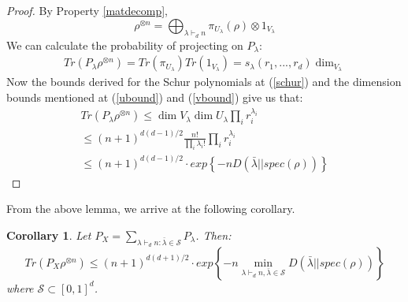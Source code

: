 \documentclass[12pt]{article}%
\newtheorem{coro}{Corollary}
\begin{document}
\begin{proof}
 By Property \ref{matdecomp},
 $$ \rho^{\otimes n} = \bigoplus_{\lambda \vdash_d n} \pi_{U_\lambda}(\rho) \otimes 1_{V_\lambda}$$
 We can calculate the probability of projecting on $P_{\lambda}$:
 \begin{gather*}
   Tr(P_\lambda\rho^{\otimes n}) = Tr(\pi_{U_\lambda})Tr(1_{V_\lambda}) = s_{\lambda}(r_1,...,r_d)\dim_{V_\lambda}
 \end{gather*}
  Now the bounds derived for the Schur polynomials at (\ref{schur}) and the dimension bounds mentioned at (\ref{ubound}) and (\ref{vbound}) give us that:
  \begin{gather*}
    Tr(P_\lambda\rho^{\otimes n}) \leq \dim{V_\lambda}\dim{U_\lambda} \prod_{i} r_i^{\lambda_i} \\
    \leq (n+1)^{d(d-1)/2}\frac{n!}{\prod_i \lambda_i!} \prod_{i} r_i^{\lambda_i} \\
    \leq (n+1)^{d(d-1)/2}\cdot exp\left\{{-n D(\bar{\lambda}||spec(\rho))}\right\}
  \end{gather*}
\end{proof}

\noindent From the above lemma, we arrive at the following corollary.

\begin{coro}
  Let $P_X = \sum_{\lambda \vdash_d n: \bar{\lambda} \in \mathcal{S}} P_\lambda$. Then:
  $$ Tr(P_X\rho^{\otimes n}) \leq (n+1)^{d(d+1)/2} \cdot exp\left\{-n \min_{\lambda \vdash_d n, \bar{\lambda} \in \mathcal{S}}{D(\bar{\lambda}||spec(\rho))} \right\}$$
where $\mathcal{S} \subset [0,1]^d$.
\end{coro}
\end{document}

